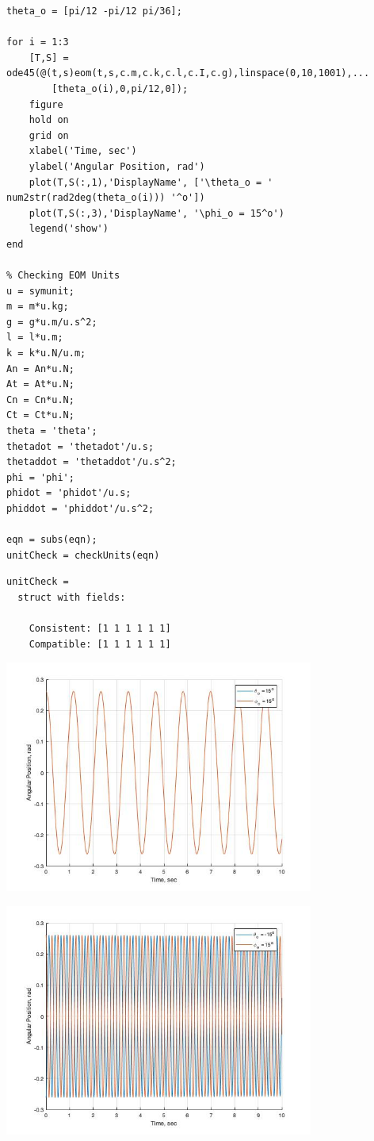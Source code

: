 \begin{lstlisting}[frame=lines,style=Matlab-editor]
theta_o = [pi/12 -pi/12 pi/36];

for i = 1:3
    [T,S] = ode45(@(t,s)eom(t,s,c.m,c.k,c.l,c.I,c.g),linspace(0,10,1001),...
        [theta_o(i),0,pi/12,0]);
    figure
    hold on
    grid on
    xlabel('Time, sec')
    ylabel('Angular Position, rad')
    plot(T,S(:,1),'DisplayName', ['\theta_o = ' num2str(rad2deg(theta_o(i))) '^o'])
    plot(T,S(:,3),'DisplayName', '\phi_o = 15^o')
    legend('show')
end

% Checking EOM Units
u = symunit;
m = m*u.kg;
g = g*u.m/u.s^2;
l = l*u.m;
k = k*u.N/u.m;
An = An*u.N;
At = At*u.N;
Cn = Cn*u.N;
Ct = Ct*u.N;
theta = 'theta';
thetadot = 'thetadot'/u.s;
thetaddot = 'thetaddot'/u.s^2;
phi = 'phi';
phidot = 'phidot'/u.s;
phiddot = 'phiddot'/u.s^2;

eqn = subs(eqn);
unitCheck = checkUnits(eqn)
\end{lstlisting}
\color{gray} \begin{verbatim}
unitCheck =
  struct with fields:

    Consistent: [1 1 1 1 1 1]
    Compatible: [1 1 1 1 1 1]
\end{verbatim} \color{black}
\center
\includegraphics[center,width=4in]{rigid_01.jpg}

\includegraphics[center,width=4in]{rigid_02.jpg}

